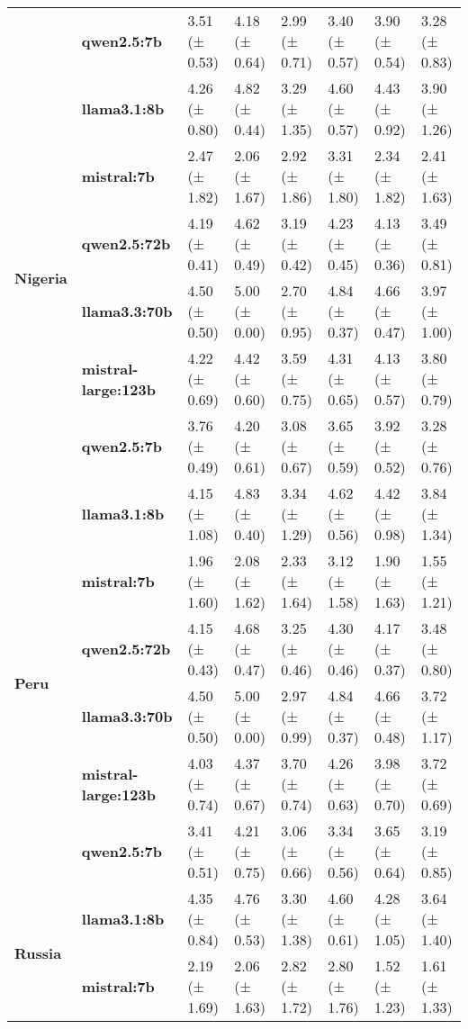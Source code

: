 \begin{longtable}{llllllll}
\textbf{} & \textbf{qwen2.5:7b} & 3.51 (± 0.53) & 4.18 (± 0.64) & 2.99 (± 0.71) & 3.40 (± 0.57) & 3.90 (± 0.54) & 3.28 (± 0.83) \\
\cline{1-8}
\multirow[t]{6}{*}{\textbf{Nigeria}} & \textbf{llama3.1:8b} & 4.26 (± 0.80) & 4.82 (± 0.44) & 3.29 (± 1.35) & 4.60 (± 0.57) & 4.43 (± 0.92) & 3.90 (± 1.26) \\
\textbf{} & \textbf{mistral:7b} & 2.47 (± 1.82) & 2.06 (± 1.67) & 2.92 (± 1.86) & 3.31 (± 1.80) & 2.34 (± 1.82) & 2.41 (± 1.63) \\
\textbf{} & \textbf{qwen2.5:72b} & 4.19 (± 0.41) & 4.62 (± 0.49) & 3.19 (± 0.42) & 4.23 (± 0.45) & 4.13 (± 0.36) & 3.49 (± 0.81) \\
\textbf{} & \textbf{llama3.3:70b} & 4.50 (± 0.50) & 5.00 (± 0.00) & 2.70 (± 0.95) & 4.84 (± 0.37) & 4.66 (± 0.47) & 3.97 (± 1.00) \\
\textbf{} & \textbf{mistral-large:123b} & 4.22 (± 0.69) & 4.42 (± 0.60) & 3.59 (± 0.75) & 4.31 (± 0.65) & 4.13 (± 0.57) & 3.80 (± 0.79) \\
\textbf{} & \textbf{qwen2.5:7b} & 3.76 (± 0.49) & 4.20 (± 0.61) & 3.08 (± 0.67) & 3.65 (± 0.59) & 3.92 (± 0.52) & 3.28 (± 0.76) \\
\cline{1-8}
\multirow[t]{6}{*}{\textbf{Peru}} & \textbf{llama3.1:8b} & 4.15 (± 1.08) & 4.83 (± 0.40) & 3.34 (± 1.29) & 4.62 (± 0.56) & 4.42 (± 0.98) & 3.84 (± 1.34) \\
\textbf{} & \textbf{mistral:7b} & 1.96 (± 1.60) & 2.08 (± 1.62) & 2.33 (± 1.64) & 3.12 (± 1.58) & 1.90 (± 1.63) & 1.55 (± 1.21) \\
\textbf{} & \textbf{qwen2.5:72b} & 4.15 (± 0.43) & 4.68 (± 0.47) & 3.25 (± 0.46) & 4.30 (± 0.46) & 4.17 (± 0.37) & 3.48 (± 0.80) \\
\textbf{} & \textbf{llama3.3:70b} & 4.50 (± 0.50) & 5.00 (± 0.00) & 2.97 (± 0.99) & 4.84 (± 0.37) & 4.66 (± 0.48) & 3.72 (± 1.17) \\
\textbf{} & \textbf{mistral-large:123b} & 4.03 (± 0.74) & 4.37 (± 0.67) & 3.70 (± 0.74) & 4.26 (± 0.63) & 3.98 (± 0.70) & 3.72 (± 0.69) \\
\textbf{} & \textbf{qwen2.5:7b} & 3.41 (± 0.51) & 4.21 (± 0.75) & 3.06 (± 0.66) & 3.34 (± 0.56) & 3.65 (± 0.64) & 3.19 (± 0.85) \\
\cline{1-8}
\multirow[t]{6}{*}{\textbf{Russia}} & \textbf{llama3.1:8b} & 4.35 (± 0.84) & 4.76 (± 0.53) & 3.30 (± 1.38) & 4.60 (± 0.61) & 4.28 (± 1.05) & 3.64 (± 1.40) \\
\textbf{} & \textbf{mistral:7b} & 2.19 (± 1.69) & 2.06 (± 1.63) & 2.82 (± 1.72) & 2.80 (± 1.76) & 1.52 (± 1.23) & 1.61 (± 1.33) \\

\end{longtable}
